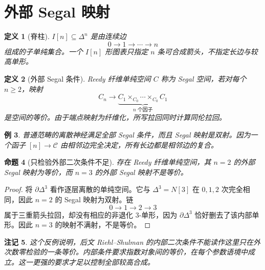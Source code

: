 \documentclass[12pt,oneside,openany,fontset=none]{ctexbook}
\theoremstyle{cn}
\newtheorem{definition}{定义}[chapter]
\newtheorem{example}[definition]{例}
\newtheorem{proposition}[definition]{命题}
\newtheorem{remark}[definition]{注记}
\numberwithin{equation}{chapter}
\begin{document}
\section{外部 Segal 映射}
\begin{definition}[脊柱]
$I[n]\subseteq\Delta^n$ 是由连续边
\[
0\to1\to\cdots\to n
\]
组成的子单纯集合。一个 $I[n]$ 形图表只指定 $n$ 条可合成箭头，不指定长边与较高单形。
\end{definition}
\begin{definition}[外部 Segal 条件]
Reedy 纤维单纯空间 $C$ 称为 Segal 空间，若对每个 $n\ge2$，映射
\[
C_n\longrightarrow
\underbrace{C_1\times_{C_0}\cdots\times_{C_0}C_1}_{n\text{ 个因子}}
\]
是空间的等价。由于端点映射为纤维化，所写拉回同时计算同伦拉回。
\end{definition}
\begin{example}
普通范畴的离散神经满足全部 Segal 条件，而且 Segal 映射是双射。因为一个函子 $[n]\to\mathcal C$ 由相邻边完全决定，所有长边都是相邻边的复合。
\end{example}
\begin{proposition}[只检验外部二次条件不足]
存在 Reedy 纤维单纯空间，其 $n=2$ 的外部 Segal 映射为等价，而 $n=3$ 的外部 Segal 映射不是等价。
\end{proposition}
\begin{proof}
将 $\partial\Delta^3$ 看作逐层离散的单纯空间。它与 $\Delta^3=N[3]$ 在 $0,1,2$ 次完全相同，因此 $n=2$ 的 Segal 映射为双射。链
\[
0\to1\to2\to3
\]
属于三重箭头拉回，却没有相应的非退化 $3$-单形，因为 $\partial\Delta^3$ 恰好删去了该内部单形。因此 $n=3$ 的映射不满射，不是等价。
\end{proof}
\begin{remark}
这个反例说明，后文 Riehl--Shulman 的内部二次条件不能读作这里只在外次数零检验的一条等价。内部条件要求指数对象间的等价，在每个参数语境中成立。这一更强的要求才足以控制全部较高合成。
\end{remark}
\end{document}
